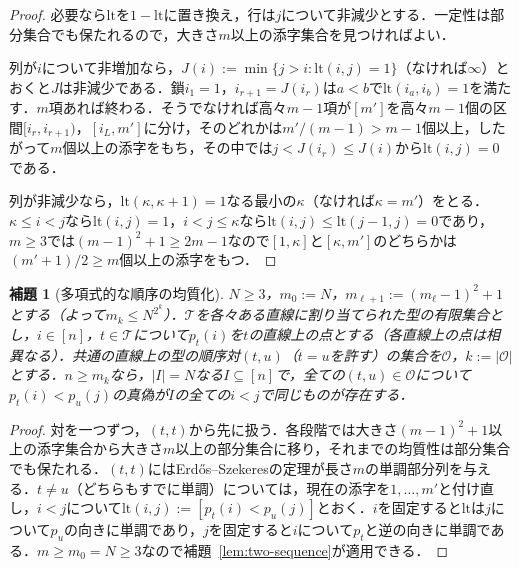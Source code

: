 \documentclass[11pt,a4paper]{ltjsarticle}
\numberwithin{equation}{section}
\theoremstyle{plain}
\newtheorem{lemma}[theorem]{補題}
\theoremstyle{definition}
\theoremstyle{remark}
\begin{document}
\begin{proof}
必要なら$\mathrm{lt}$を$1-\mathrm{lt}$に置き換え，行は$j$について非減少とする．一定性は部分集合でも保たれるので，大きさ$m$以上の添字集合を見つければよい．

列が$i$について非増加なら，$J(i):=\min\{j>i:\mathrm{lt}(i,j)=1\}$（なければ$\infty$）とおくと$J$は非減少である．鎖$i_1=1$，$i_{r+1}=J(i_r)$は$a<b$で$\mathrm{lt}(i_a,i_b)=1$を満たす．$m$項あれば終わる．そうでなければ高々$m-1$項が$[m']$を高々$m-1$個の区間$[i_r,i_{r+1})$，$[i_L,m']$に分け，そのどれかは$m'/(m-1)>m-1$個以上，したがって$m$個以上の添字をもち，その中では$j<J(i_r)\le J(i)$から$\mathrm{lt}(i,j)=0$である．

列が非減少なら，$\mathrm{lt}(\kappa,\kappa+1)=1$なる最小の$\kappa$（なければ$\kappa=m'$）をとる．$\kappa\le i<j$なら$\mathrm{lt}(i,j)=1$，$i<j\le\kappa$なら$\mathrm{lt}(i,j)\le \mathrm{lt}(j-1,j)=0$であり，$m\ge3$では$(m-1)^2+1\ge2m-1$なので$[1,\kappa]$と$[\kappa,m']$のどちらかは$(m'+1)/2\ge m$個以上の添字をもつ．
\end{proof}

\begin{lemma}[多項式的な順序の均質化]
\label{lem:order-homogenize}
$N\ge3$，$m_0:=N$，$m_{\ell+1}:=(m_\ell-1)^2+1$とする（よって$m_k\le N^{2^k}$）．$\mathcal T$を各々ある直線に割り当てられた型の有限集合とし，$i\in[n]$，$t\in \mathcal T$について$p_t(i)$を$t$の直線上の点とする（各直線上の点は相異なる）．共通の直線上の型の順序対$(t,u)$（$t=u$を許す）の集合を$\mathcal O$，$k:=|\mathcal O|$とする．$n\ge m_k$なら，$|I|=N$なる$I\subseteq[n]$で，全ての$(t,u)\in\mathcal O$について$p_t(i)<p_u(j)$の真偽が$I$の全ての$i<j$で同じものが存在する．
\end{lemma}

\begin{proof}
対を一つずつ，$(t,t)$から先に扱う．各段階では大きさ$(m-1)^2+1$以上の添字集合から大きさ$m$以上の部分集合に移り，それまでの均質性は部分集合でも保たれる．$(t,t)$にはErd\H{o}s--Szekeresの定理が長さ$m$の単調部分列を与える．$t\ne u$（どちらもすでに単調）については，現在の添字を$1,\ldots,m'$と付け直し，$i<j$について$\mathrm{lt}(i,j):=[p_t(i)<p_u(j)]$とおく．$i$を固定すると$\mathrm{lt}$は$j$について$p_u$の向きに単調であり，$j$を固定すると$i$について$p_t$と逆の向きに単調である．$m\ge m_0=N\ge3$なので補題~\ref{lem:two-sequence}が適用できる．
\end{proof}
\end{document}
